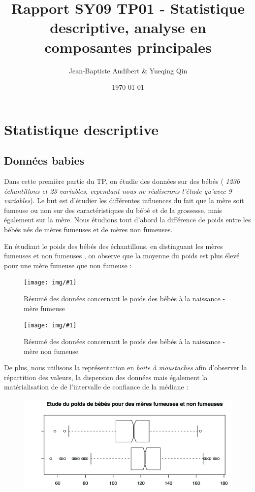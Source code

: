 \documentclass[a4paper,11pt]{article}
\title{Rapport SY09 TP01 - Statistique descriptive, analyse en composantes principales}
\author{Jean-Baptiste Audibert \& Yueqing Qin}
\date{\today}
\newcommand{\InsertFigTitle}[2]{
\begin{figure}[H]
\caption{#2}
\begin{center}
\texttt{[image: img/\#1]}
\end{center}
\end{figure}}
\begin{document}
\maketitle

\section{Statistique descriptive} 

\subsection{Données babies}

\noindent Dans cette première partie du TP, on étudie des données sur des bébés (\textit{ 1236 échantillons et 23 variables, cependant nous ne réaliserons l'étude qu'avec 9 variables}). Le but est d'étudier les différentes influences du fait que la mère soit fumeuse ou non sur des caractéristiques du bébé et de la grossesse, mais également sur la mère.
\noindent Nous étudions tout d'abord la différence de poids entre les bébés nés de mères fumeuses et de mères non fumeuses.

\noindent En étudiant le poids des bébés des échantillons, en distinguant les mères fumeuses et non fumeuses , on observe que la moyenne du poids est plus élevé pour une mère fumeuse que non fumeuse : 

\InsertFigTitle{poidsBebesFumeurs}{Résumé des données concernant le poids des bébés à la naissance - mère fumeuse}

\InsertFigTitle{poidsBebesNonFumeurs}{Résumé des données concernant le poids des bébés à la naissance - mère non fumeuse}

\noindent De plus, nous utilisons la représentation en \textit{boite à moustaches} afin d'observer la répartition des valeurs, la dispersion des données mais également la matérialisation de de l'intervalle de confiance de la médiane :  

\begin{figure}[H]
\begin{center}
\includegraphics[width=.7\textwidth]{img/poidsbb.jpg}
\end{center}
\end{figure}
\end{document}
